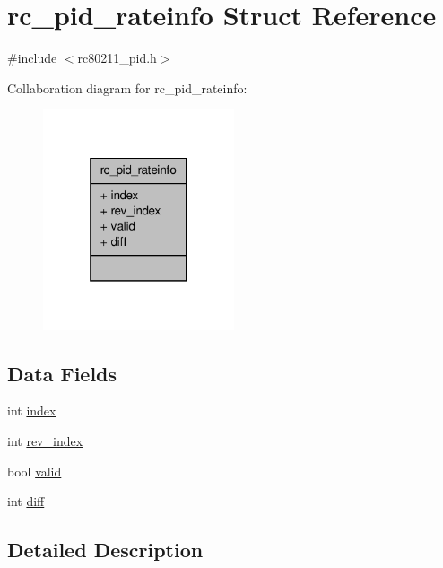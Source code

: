 \hypertarget{structrc__pid__rateinfo}{\section{rc\-\_\-pid\-\_\-rateinfo Struct Reference}
\label{structrc__pid__rateinfo}
}


{\ttfamily \#include $<$rc80211\-\_\-pid.\-h$>$}



Collaboration diagram for rc\-\_\-pid\-\_\-rateinfo\-:
\nopagebreak
\begin{figure}[H]
\begin{center}
\leavevmode
\includegraphics[width=160pt]{structrc__pid__rateinfo__coll__graph}
\end{center}
\end{figure}
\subsection*{Data Fields}
\begin{DoxyCompactItemize}
\item 
int \hyperlink{structrc__pid__rateinfo_a750b5d744c39a06bfb13e6eb010e35d0}{index}
\item 
int \hyperlink{structrc__pid__rateinfo_ab2a252c7807fa54334cd1bbc0ec2d894}{rev\-\_\-index}
\item 
bool \hyperlink{structrc__pid__rateinfo_a28e3c179a86f337095088b3ca02a2b2a}{valid}
\item 
int \hyperlink{structrc__pid__rateinfo_a65f3a8178e1f997a7a19a988bb0f4e1a}{diff}
\end{DoxyCompactItemize}


\subsection{Detailed Description}


